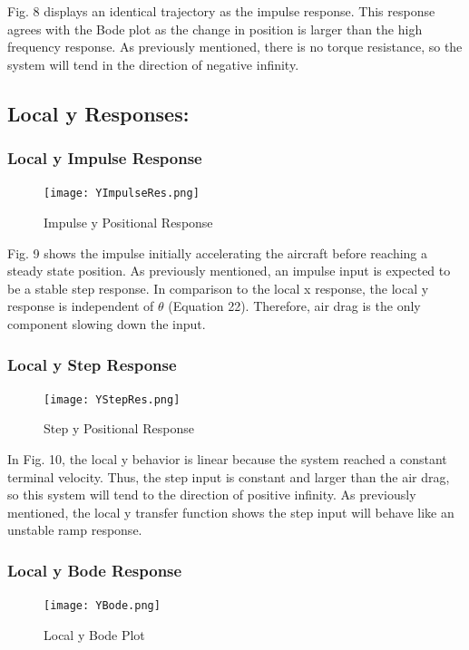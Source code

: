 \documentclass[conference]{IEEEtran}
\begin{document}
Fig. 8 displays an identical trajectory as the impulse response. This response agrees with the Bode plot as the change in position is larger than the high frequency response. As previously mentioned, there is no torque resistance, so the system will tend in the direction of negative infinity. \\

\newpage
\subsection{Local y Responses:}
\subsubsection{Local y Impulse Response} 
\begin{figure}[htbp]
\centerline{\texttt{[image: YImpulseRes.png]}}
\caption{Impulse y Positional Response}
\label{figure}
\end{figure}

Fig. 9 shows the impulse initially accelerating the aircraft before reaching a steady state position. As previously mentioned, an impulse input is expected to be a stable step response. In comparison to the local x response, the local y response is independent of $\theta$ (Equation 22). Therefore, air drag is the only component slowing down the input. \\


\subsubsection{Local y Step Response} 
\begin{figure}[htbp]
\centerline{\texttt{[image: YStepRes.png]}}
\caption{Step y Positional Response}
\label{figure}
\end{figure}

In Fig. 10, the local y behavior is linear because the system reached a constant terminal velocity. Thus, the step input is constant and larger than the air drag, so this system will tend to the direction of positive infinity. As previously mentioned, the local y transfer function shows the step input will behave like an unstable ramp response. 

\newpage
\subsubsection{Local y Bode Response} 
\begin{figure}[htbp]
\centerline{\texttt{[image: YBode.png]}}
\caption{Local y Bode Plot}
\label{figure}
\end{figure}
\end{document}
